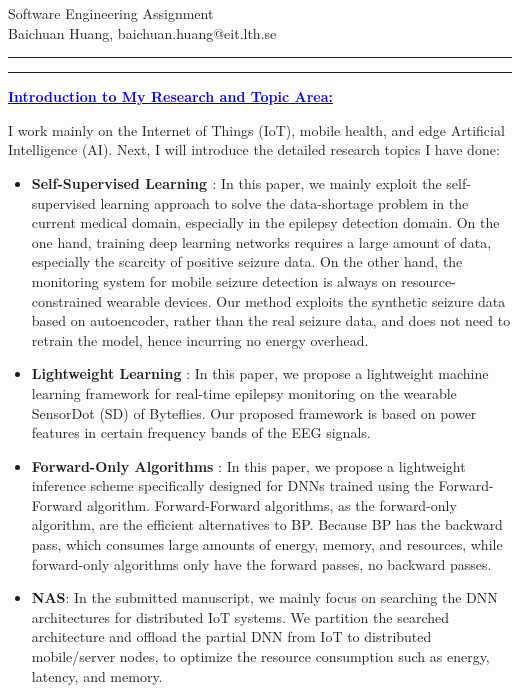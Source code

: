 \documentclass[11pt]{article}
\newcommand{\soptitle}{Software Engineering Assignment}
\newcommand{\yourname}{Baichuan Huang}
\newcommand{\statement}[1]{\par\medskip
  \underline{\textcolor{blue}{\textbf{#1:}}}\space
}
\begin{document}
\begin{center}\LARGE\soptitle\\
\large \yourname, baichuan.huang@eit.lth.se
\end{center}

\hrule
\vspace{1pt}
\hrule height 1pt

\bigskip

\statement{Introduction to My Research and Topic Area} 

I work mainly on the Internet of Things (IoT), mobile health, and edge Artificial Intelligence (AI). Next, I will introduce the detailed research topics I have done:

\begin{itemize}
  \item \textbf{Self-Supervised Learning \cite{huang2023epilepsynet}}: In this paper, we mainly exploit the self-supervised learning approach to solve the data-shortage problem in the current medical domain, especially in the epilepsy detection domain. On the one hand, training deep learning networks requires a large amount of data, especially the scarcity of positive seizure data. On the other hand, the monitoring system for mobile seizure detection is always on resource-constrained wearable devices. Our method exploits the synthetic seizure data based on autoencoder, rather than the real seizure data, and does not need to retrain the model, hence incurring no energy overhead.
  
  \item \textbf{Lightweight Learning} \cite{huang2023lightweight}: In this paper, we propose a lightweight machine learning framework for real-time epilepsy monitoring on the wearable SensorDot (SD) of Byteflies. Our proposed framework is based on power features in certain frequency bands of the \gls{EEG} signals.
  \item \textbf{Forward-Only Algorithms} \cite{aminifar2024lightweight}: In this paper, we propose a lightweight inference scheme specifically designed for \glspl{DNN} trained using the Forward-Forward algorithm. Forward-Forward algorithms, as the forward-only algorithm, are the efficient alternatives to \gls{BP}. Because \gls{BP} has the backward pass, which consumes large amounts of energy, memory, and resources, while forward-only algorithms only have the forward passes, no backward passes.
    \item \textbf{\gls{NAS}}: In the submitted manuscript, we mainly focus on searching the \gls{DNN} architectures for distributed \gls{IoT} systems. We partition the searched architecture and offload the partial \gls{DNN} from \gls{IoT} to distributed mobile/server nodes, to optimize the resource consumption such as energy, latency, and memory. 
\end{itemize}
\end{document}
